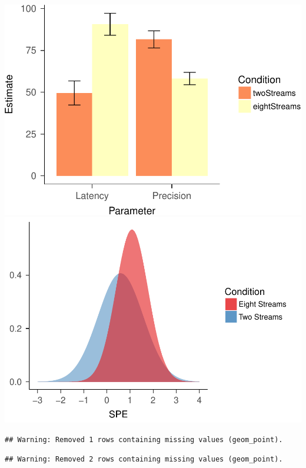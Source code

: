 \documentclass[,man]{apa6}
\begin{document}
\includegraphics{nStreams_Bayesian_files/figure-latex/unnamed-chunk-6-1.pdf}
\includegraphics{nStreams_Bayesian_files/figure-latex/unnamed-chunk-6-2.pdf}

\begin{verbatim}
## Warning: Removed 1 rows containing missing values (geom_point).
\end{verbatim}

\begin{verbatim}
## Warning: Removed 2 rows containing missing values (geom_point).
\end{verbatim}
\end{document}
